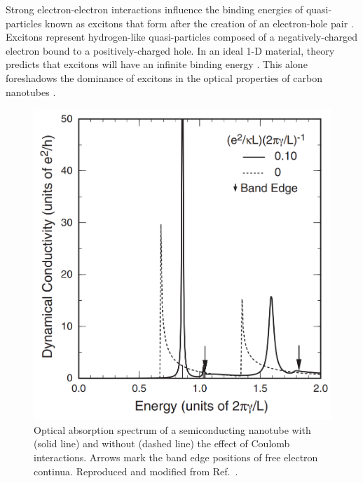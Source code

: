 Strong electron-electron interactions influence the binding energies of quasi-particles known as excitons that form after the creation of an electron-hole pair \cite{Ashcroft}. Excitons represent hydrogen-like quasi-particles composed of a negatively-charged electron bound to a positively-charged hole. In an ideal 1-D material, theory predicts that excitons will have an infinite binding energy \cite{loudon1959one, elliott1959theory}. This alone foreshadows the dominance of excitons in the optical properties of carbon nanotubes \cite{ando2005theory}.

\begin{figure}[ht]
	\centering
	\includegraphics[scale=0.3]{images/chapter_optical_props/ando_suppression}
	\caption{Optical absorption spectrum of a semiconducting nanotube with (solid line) and without (dashed line) the effect of Coulomb interactions. Arrows mark the band edge positions of free electron continua. Reproduced and modified from Ref.\ \cite{ando2005theory}.}
	\label{fig:ando_suppression}
\end{figure}

